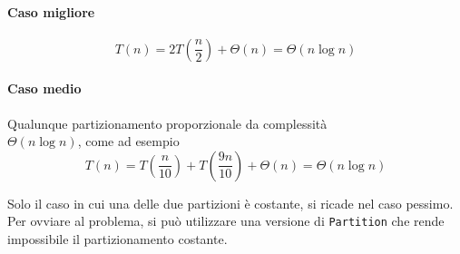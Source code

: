 \paragraph{Caso migliore}
$$T(n) = 2 T\left( \frac{n}{2} \right) + \Theta (n) = \Theta(n \log n)$$

\paragraph{Caso medio} Qualunque partizionamento proporzionale da complessità \\ 
$\Theta (n \log n)$, come ad esempio
$$T(n) = T \left( \frac{n}{10} \right) + T \left( \frac{9n}{10} \right) + \Theta (n) = \Theta (n \log n)$$

Solo il caso in cui una delle due partizioni è costante, si ricade nel caso pessimo. Per ovviare al
problema, si può utilizzare una versione di \texttt{Partition} che rende impossibile il partizionamento costante.


